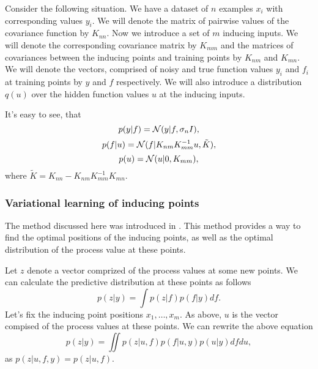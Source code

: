 \documentclass[12pt]{article}
\begin{document}
	Consider the following situation. We have a dataset of $n$ examples $x_i$ with corresponding values $y_i$. We will denote the matrix of pairwise values of the covariance function by $K_{nn}$. Now we introduce a set of $m$ inducing inputs. We will denote the corresponding covariance matrix by $K_{mm}$ and the matrices of covariances between the inducing points and training points by $K_{nm}$ and $K_{mn}$. We will denote the vectors, comprised of noisy and true function values $y_i$ and $f_i$ at training points by $y$ and $f$ respectively. We will also introduce a distribution $q(u)$ over the hidden function values $u$ at the inducing inputs.
	
	
	
	It's easy to see, that
	$$p(y|f) = \mathcal{N} (y|f, \sigma_n I),$$
	$$p(f|u) = \mathcal{N} (f|K_{nm} K_{mm}^{-1}u, \tilde K),$$
	$$p(u) = \mathcal{N}(u|0, K_{mm}),$$
	where $\tilde K = K_{nn} - K_{nm} K_{mm}^{-1} K_{mn}.$
		
	\subsubsection{Variational learning of inducing points}
		\label{Titsias}
		
		The method discussed here was introduced in \cite{Titsias}. This method provides a way to find the optimal positions of the inducing points, as well as the optimal distribution of the process value at these points.

		Let $z$ denote a vector comprized of the process values at some new points. We can calculate the predictive distribution at these points as follows
		$$p(z|y) = \int p(z|f) p(f|y) df.$$
		Let's fix the inducing point positions $x_1, \ldots, x_m$. As above, $u$ is the vector compised of the process values at these points. We can rewrite the above equation
		\begin{equation}
			\label{predictive1}
			p(z|y) = \iint p(z|u, f) p(f| u, y) p(u|y)df du,
		\end{equation}
		as $p(z|u, f, y) = p(z|u, f)$. 
\end{document}
